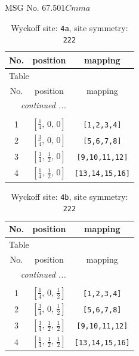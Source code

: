 \documentclass[fleqn,8pt]{jsarticle}
\begin{document}
\setcounter{MaxMatrixCols}{32}

\renewcommand{\tablename}{Table~}
\renewcommand{\figurename}{Figure~}
\begin{center}
\LARGE
MSG No. 67.501\quad$Cmma$
\end{center}
\renewcommand{\arraystretch}{1.2}
\begin{longtable}{ccc}
\caption{Wyckoff site: {\tt 4a}, site symmetry: {\tt 222}}
 \\
 \hline \hline
No. & position & mapping \\ \hline \endfirsthead

\multicolumn{2}{l}{\tablename\ \thetable{}} \\
 \hline \hline
No. & position & mapping \\ \hline \endhead

 \hline \hline
\multicolumn{2}{r}{\footnotesize\it continued ...} \\ \endfoot

 \hline \hline
\multicolumn{2}{r}{} \\ \endlastfoot

1 & $\left[ \frac{1}{4},\, 0,\, 0 \right]$ & {\tt [1,2,3,4]} \\ \hline
2 & $\left[ \frac{3}{4},\, 0,\, 0 \right]$ & {\tt [5,6,7,8]} \\ \hline
3 & $\left[ \frac{3}{4},\, \frac{1}{2},\, 0 \right]$ & {\tt [9,10,11,12]} \\ \hline
4 & $\left[ \frac{1}{4},\, \frac{1}{2},\, 0 \right]$ & {\tt [13,14,15,16]} \\
\end{longtable}
\renewcommand{\arraystretch}{1.2}
\begin{longtable}{ccc}
\caption{Wyckoff site: {\tt 4b}, site symmetry: {\tt 222}}
 \\
 \hline \hline
No. & position & mapping \\ \hline \endfirsthead

\multicolumn{2}{l}{\tablename\ \thetable{}} \\
 \hline \hline
No. & position & mapping \\ \hline \endhead

 \hline \hline
\multicolumn{2}{r}{\footnotesize\it continued ...} \\ \endfoot

 \hline \hline
\multicolumn{2}{r}{} \\ \endlastfoot

1 & $\left[ \frac{1}{4},\, 0,\, \frac{1}{2} \right]$ & {\tt [1,2,3,4]} \\ \hline
2 & $\left[ \frac{3}{4},\, 0,\, \frac{1}{2} \right]$ & {\tt [5,6,7,8]} \\ \hline
3 & $\left[ \frac{3}{4},\, \frac{1}{2},\, \frac{1}{2} \right]$ & {\tt [9,10,11,12]} \\ \hline
4 & $\left[ \frac{1}{4},\, \frac{1}{2},\, \frac{1}{2} \right]$ & {\tt [13,14,15,16]} \\
\end{longtable}
\end{document}
